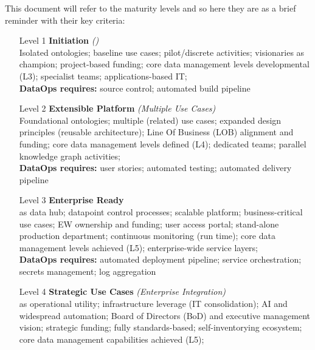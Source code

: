 %
%
This document will refer to the maturity levels and so here they are as a brief reminder with their key criteria:

\begin{itemize}[leftmargin=0.5in,font=\bfseries]

    \item [Level 1] \textbf{ Initiation} \textit{()}
    ~\\Isolated ontologies;
    baseline use cases;
    pilot/discrete activities;
    visionaries as champion;
    project-based funding;
    core data management levels developmental (L3);
    specialist teams;
    applications-based IT;\\[1em]
    \textbf{DataOps requires:}
        source control;
        automated build pipeline\\[0.5em]

    \item [Level 2] \textbf{Extensible Platform} \textit{(Multiple Use Cases)}
    ~\\Foundational ontologies;
    multiple (related) use cases;
    expanded design principles (reusable architecture);
    Line Of Business (LOB) alignment and funding;
    core data management levels defined (L4);
    dedicated teams;
    parallel knowledge graph activities;\\[1em]
    \textbf{DataOps requires:}
        user stories;
        automated testing;
        automated delivery pipeline\\[0.5em]

    \item [Level 3] \textbf{Enterprise Ready}
    ~\\ as data hub;
    datapoint control processes;
    scalable platform;
    business-critical use cases;
    EW ownership and funding;
    user access portal;
    stand-alone production department;
    continuous monitoring (run time);
    core data management levels achieved (L5);
    enterprise-wide service layers;\\[1em]
    \textbf{DataOps requires:}
        automated deployment pipeline;
        service orchestration;
        secrets management;
        log aggregation\\[0.5em]

    \item [Level 4] \textbf{Strategic Use Cases} \textit{(Enterprise Integration)}
    ~\\ as operational utility;
    infrastructure leverage (IT consolidation);
    AI and widespread automation;
    Board of Directors (BoD) and executive management vision;
    strategic funding;
    fully standards-based;
    self-inventorying ecosystem;
    core data management capabilities achieved (L5);\\[0.5em]


\end{itemize}

